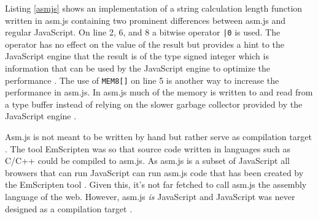 

Listing \ref{asmjs} shows an implementation of a string calculation length function written in asm.js containing two prominent differences between asm.js and regular JavaScript. On line 2, 6, and 8 a bitwise operator \texttt{|0} is used. The operator has no effect on the value of the result but provides a hint to the JavaScript engine that the result is of the type signed integer which is information that can be used by the JavaScript engine to optimize the performance \parencite{Zakai2018}. The use of \texttt{MEM8[]} on line 5 is another way to increase the performance in asm.js. In asm.js much of the memory is written to and read from a type buffer instead of relying on the slower garbage collector provided by the JavaScript engine \parencite{Zakai2011}.

Asm.js is not meant to be written by hand but rather serve as compilation target \parencite{VanEsNicolayStievenartDHondtDeRoover2016}. The tool EmScripten \parencite{Zakai2011} was so that source code written in languages such as C/C++ could be compiled to asm.js. As asm.js is a subset of JavaScript all browsers that can run JavaScript can run asm.js code that has been created by the EmScripten tool \parencite{HaasRossbergSchuffTitzerHolmanGohmanWagnerZakaiBastien2017}. Given this, it's not far fetched to call asm.js the assembly language of the web. However, asm.js \emph{is} JavaScript and JavaScript was never designed as a compilation target \parencite{Watt2018}.
